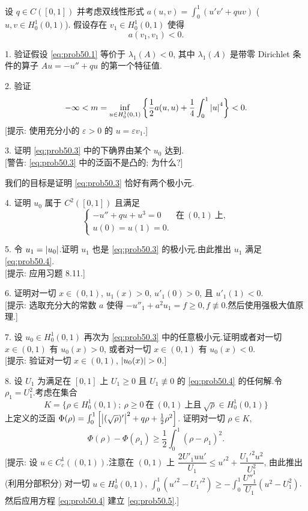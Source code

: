 \begin{problem}
\label{prob:50}
设 $q\in C([0,1])$ 并考虑双线性形式 $a(u,v)=\int_0^1(u'v'+quv)$ ($u,v\in H_0^1(0,1)$).
假设存在 $v_1\in H_0^1(0,1)$ 使得
\begin{equation}
a(v_1,v_1)<0.
\label{eq:prob50.1}
\end{equation}

1. 验证假设 \eqref{eq:prob50.1} 等价于 $\lambda_1(A)<0$, 其中 $\lambda_1(A)$ 是带零
Dirichlet 条件的算子 $Au=-u''+qu$ 的第一个特征值.

2. 验证
\begin{equation}
-\infty<m=\inf_{u\in H_0^1(0,1)}\left\{\frac12a(u,u)+\frac14\int_0^1\left|u\right|^4\right\}<0.
\label{eq:prob50.3}
\end{equation}
[提示: 使用充分小的 $\varepsilon>0$ 的 $u=\varepsilon v_1$.]

3. 证明 \eqref{eq:prob50.3} 中的下确界由某个 $u_0$ 达到.\\
{[警告: \eqref{eq:prob50.3} 中的泛函不是凸的; 为什么?]}

我们的目标是证明 \eqref{eq:prob50.3} 恰好有两个极小元.

4. 证明 $u_0$ 属于 $C^2([0,1])$ 且满足
\begin{equation}
\begin{cases}
-u''+qu+u^3=0 & \text{在}\ (0,1)\ \text{上},\\
u(0)=u(1)=0.
\end{cases}
\label{eq:prob50.4}
\end{equation}

5. 令 $u_1=\left|u_0\right|$.证明 $u_1$ 也是 \eqref{eq:prob50.3} 的极小元.由此推出 $u_1$
满足 \eqref{eq:prob50.4}.\\
{[提示: 应用习题 8.11.]}

6. 证明对一切 $x\in(0,1)$, $u_1(x)>0$, $u'_1(0)>0$, 且 $u'_1(1)<0$.\\
{[提示: 选取充分大的常数 $a$ 使得 $-u''_1+a^2u_1=f\ge0,f\not\equiv0$.然后使用强极大值原理.]}

7. 设 $u_0\in H_0^1(0,1)$ 再次为 \eqref{eq:prob50.3} 中的任意极小元.证明或者对一切
$x\in(0,1)$ 有 $u_0(x)>0$, 或者对一切 $x\in(0,1)$ 有 $u_0(x)<0$.\\
{[提示: 验证对一切 $x\in(0,1)$, $\abs{u_0(x)}>0$.]}

8. 设 $U_1$ 为满足在 $[0,1]$ 上 $U_1\ge0$ 且 $U_1\not\equiv0$ 的 \eqref{eq:prob50.4}
的任何解.令 $\rho_1=U_1^2$.考虑在集合
\begin{equation*}
K=\{\rho\in H_0^1(0,1);\ \rho\ge0\ \text{在}\ (0,1)\ \text{上且}\ \sqrt{\rho}\in H_0^1(0,1)\}
\end{equation*}
上定义的泛函 $\Phi(\rho)=\int_0^1\left[\left|(\sqrt{\rho})'\right|^2+q\rho+\frac12\rho^2\right]$.
证明对一切 $\rho\in K$,
\begin{equation}
\Phi(\rho)-\Phi(\rho_1)\ge\frac12\int_0^1(\rho-\rho_1)^2.
\label{eq:prob50.5}
\end{equation}
[提示: 设 $u\in C_c^1((0,1))$.注意在 $(0,1)$ 上
$\dfrac{2U'_1uu'}{U_1}\le u'^2+\dfrac{U_1'^2u^2}{U_1^2}$, 由此推出 (利用分部积分)
对一切 $u\in H_0^1(0,1)$, $\int_0^1(u'^2-U_1'^2)\ge-\int_0^1\dfrac{U''_1}{U_1}(u^2-U_1^2)$.
然后应用方程 \eqref{eq:prob50.4} 建立 \eqref{eq:prob50.5}.]


\end{problem}
